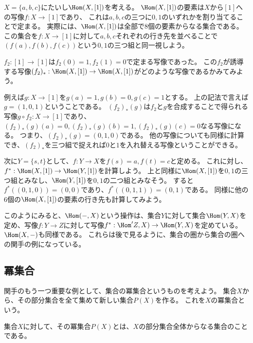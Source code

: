 \documentclass[uplatex]{jsarticle}
\begin{document}
\begin{eg}
$X=\{a,b,c\}$にたいし$\Hom(X,[1])$を考える。
$\Hom(X,[1])$の要素は$X$から$[1]$への写像$f:X \to [1]$であり、
これは$a, b, c$の三つに$0, 1$のいずれかを割り当てることで定まる。
実際には、$\Hom(X, [1])$は全部で$8$個の要素からなる集合である。
この集合を$f:X \to [1]$に対して$a, b, c$それぞれの行き先を並べることで$(f(a), f(b), f(c))$という$0,1$の三つ組と同一視しよう。

\vspace{5pt}

$f_2:[1] \to [1]$は$f_2(0)=1, f_2(1)=0$で定まる写像であった。
この$f_2$が誘導する写像$(f_2)_*:\Hom(X,[1]) \to \Hom(X, [1])$がどのような写像であるかみてみよう。

\vspace{5pt}

例えば$g:X \to [1]$を$g(a)=1, g(b)=0, g(c)=1$とする。
上の記法で言えば$g=(1,0,1)$ということである。
$(f_2)_*(g)$は$f_2$と$g$を合成することで得られる写像$g\circ f_2:X \to [1]$であり、$(f_2)_*(g)(a)=0, (f_2)_*(g)(b)=1, (f_2)_*(g)(c)=0$なる写像になる。
つまり、$(f_2)_*(g)=(0,1,0)$である。
他の写像についても同様に計算でき、$(f_2)_*$を三つ組で捉えれば$0$と$1$を入れ替える写像ということができる。

\vspace{5pt}

次に$Y=\{s,t\}$として、$f:Y \to X$を$f(s)=a, f(t)=c$と定める。
これに対し、$f^*:\Hom(X,[1]) \to \Hom(Y,[1])$を計算しよう。
上と同様に$\Hom(X,[1])$を$0,1$の三つ組とみなし、$\Hom(Y,[1])$を$0, 1$の二つ組とみなそう。
すると$f^*((0,1,0))=(0,0)$であり、$f^*((0,1,1))=(0,1)$である。
同様に他の$6$個の$\Hom(X,[1])$の要素の行き先も計算してみよう。
\end{eg}

\vspace{15pt}

このようにみると、$\Hom(-,X)$という操作は、集合$Y$に対して集合$\Hom(Y,X)$を定め、写像$f:Y \to Z$に対して写像$f^*:\Hom'Z,X) \to \Hom(Y,X)$を定めている。
$\Hom(X,-)$も同様である。
これらは後で見るように、集合の圏から集合の圏への関手の例になっている。

\subsection{冪集合}
関手のもう一つ重要な例として、集合の冪集合というものを考えよう。
集合$X$から、その部分集合を全て集めて新しい集合$P(X)$を作る。
これを$X$の冪集合という。

\begin{dfn}[冪集合]
集合$X$に対して、その冪集合$P(X)$とは、$X$の部分集合全体からなる集合のことである。
\end{dfn}
\end{document}
